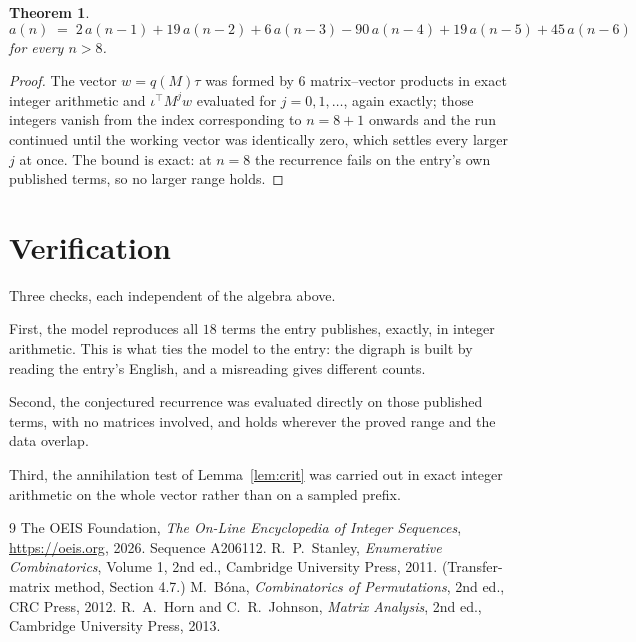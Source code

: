 \documentclass[11pt,a4paper]{article}
\theoremstyle{plain}
\newtheorem{theorem}{Theorem}
\theoremstyle{definition}
\begin{document}
\begin{theorem}
\[
a(n)\;=\;2\,a(n-1) + 19\,a(n-2) + 6\,a(n-3) - 90\,a(n-4) + 19\,a(n-5) + 45\,a(n-6)
\]
for every $n>8$.
\end{theorem}

\begin{proof}
The vector $w=q(M)\tau$ was formed by $6$ matrix--vector products in exact integer
arithmetic and $\iota^{\!\top}M^{j}w$ evaluated for $j=0,1,\dots$, again exactly; those
integers vanish from the index corresponding to $n=8+1$ onwards and the run continued
until the working vector was identically zero, which settles every larger $j$ at once. The bound is exact: at $n=8$ the recurrence fails on the entry's own published terms, so no larger range holds.
\end{proof}

\section{Verification}

Three checks, each independent of the algebra above.

First, the model reproduces all $18$ terms the entry publishes, exactly, in integer
arithmetic. This is what ties the model to the entry: the digraph is built by reading the
entry's English, and a misreading gives different counts.

Second, the conjectured recurrence was evaluated directly on those published terms, with no
matrices involved, and holds wherever the proved range and the data overlap.

Third, the annihilation test of Lemma~\ref{lem:crit} was carried out in exact integer
arithmetic on the whole vector rather than on a sampled prefix.

\begin{thebibliography}{9}
 The OEIS Foundation, \emph{The On-Line Encyclopedia of Integer
Sequences}, \url{https://oeis.org}, 2026. Sequence A206112.
 R.~P.~Stanley, \emph{Enumerative Combinatorics}, Volume 1, 2nd ed.,
Cambridge University Press, 2011. (Transfer-matrix method, Section 4.7.)
 M.~B\'ona, \emph{Combinatorics of Permutations}, 2nd ed., CRC
Press, 2012.
 R.~A.~Horn and C.~R.~Johnson, \emph{Matrix Analysis}, 2nd ed., Cambridge
University Press, 2013.
\end{thebibliography}
\end{document}
